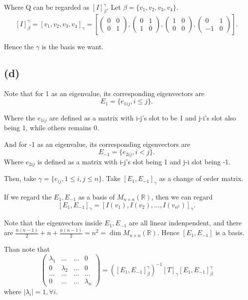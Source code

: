 \documentclass[12pt]{article}%
\begin{document}
Where Q can be regarded as $[I]_{\beta}^{\gamma}.$ Let $\beta=\{v_1,v_2,v_3,v_4\}.$ $$[I]_{\beta}^{\gamma}=[v_1,v_2,v_3,v_4]_\gamma=[\begin{pmatrix} 0&0\\0&1\end{pmatrix},\begin{pmatrix} 0&1\\1&0\end{pmatrix},\begin{pmatrix} 1&0\\0&0\end{pmatrix},\begin{pmatrix} 0&1\\-1&0\end{pmatrix}].$$

Hence the $\gamma$ is the basis we want.

\subsection{(d)}
Note that for 1 as an eigenvalue, its corresponding eigenvectors are $$E_1 = \{e_{1ij},i\leq j\}.$$

Where the $e_{1ij}$ are defined as a matrix with i-j's slot to be 1 and j-i's slot also being 1, while others remains 0.

And for -1 as an eigenvalue, its corresponding eigenvectors are $$E_{-1} = \{e_{2ij},i<j\}.$$ Where $e_{2ij}$ is defined as a matrix with i-j's slot being 1 and j-i slot being -1.

Then, take $\gamma=\{e_{ij},1\leq i,j \leq n\}.$ Take $[E_1, E_{-1}]_\gamma$ as a change of order matrix.

If we regard the $E_1, E_{-1}$ as a basis of $M_{n \times n}(\mathbb{R})$, then we can regard $$[E_1, E_{-1}]_\gamma=[I(v_1),I(v_2),...,I(v_{n^2})]_\gamma.$$

Note that the eigenvectors inside $E_1,E_{-1}$ are all linear indenpendent, and there are $\frac{n(n-1)}{2}+n + \frac{n(n-1)}{2}=n^2=\dim{M_{n \times n}(\mathbb{R})}.$ Hence $[E_1,E_{-1}]$ is a basis.

Than note that $$\begin{pmatrix} \lambda_1&...&...&0\\0&\lambda_2&...&0\\...&...&...&...\\0&...&...&\lambda_n\end{pmatrix} = ([E_1,E_{-1}]_{\beta}^{\gamma})^{-1} [T]_{\gamma}[E_1,E_{-1}]_{\beta}^{\gamma}$$ where $|\lambda_i|=1, \forall i.$
\end{document}
